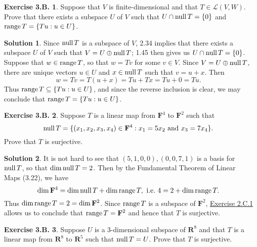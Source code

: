 \documentclass[12pt]{article}
\theoremstyle{definition}
\theoremstyle{exercise}
\newtheorem{exercise}{Exercise 3.B.}
\theoremstyle{solution}
\newtheorem*{solution}{Solution}
\newcommand{\lmap}{\mathcal{L}}
\newcommand{\Null}{\text{null\,}}
\newcommand{\Range}{\text{range\,}}
\newcommand{\R}{\mathbf{R}}
\newcommand{\F}{\mathbf{F}}
\begin{document}
\begin{exercise}
\label{ex:12}
    Suppose that \( V \) is finite-dimensional and that \( T \in \lmap(V, W) \). Prove that there exists a subspace \( U \) of \( V \) such that \( U \cap \Null T = \{ 0 \} \) and \( \Range T = \{ Tu : u \in U \} \).
\end{exercise}

\begin{solution}
    Since \( \Null T \) is a subspace of \( V \), 2.34 implies that there exists a subspace \( U \) of \( V \) such that \( V = U \oplus \Null T \); 1.45 then gives us \( U \cap \Null T = \{ 0 \} \). Suppose that \( w \in \Range T \), so that \( w = Tv \) for some \( v \in V \). Since \( V = U \oplus \Null T \), there are unique vectors \( u \in U \) and \( x \in \Null T \) such that \( v = u + x \). Then
    \[
        w = Tv = T(u + x) = Tu + Tx = Tu + 0 = Tu.
    \]
    Thus \( \Range T \subseteq \{ Tu : u \in U \} \), and since the reverse inclusion is clear, we may conclude that \( \Range T = \{ Tu : u \in U \} \).
\end{solution}

\begin{exercise}
\label{ex:13}
    Suppose \( T \) is a linear map from \( \F^4 \) to \( \F^2 \) such that
    \[
        \Null T = \{ (x_1, x_2, x_3, x_4) \in \F^4 : x_1 = 5 x_2 \text{ and } x_3 = 7 x_4 \}.
    \]
    Prove that \( T \) is surjective.
\end{exercise}

\begin{solution}
    It is not hard to see that \( (5, 1, 0, 0), (0, 0, 7, 1) \) is a basis for \( \Null T \), so that \( \dim \Null T = 2 \). Then by the Fundamental Theorem of Linear Maps (3.22), we have
    \[
        \dim \F^4 = \dim \Null T + \dim \Range T, \text{ i.e.\ } 4 = 2 + \dim \Range T.
    \]
    Thus \( \dim \Range T = 2 = \dim \F^2 \). Since \( \Range T \) is a subspace of \( \F^2 \), \href{https://lew98.github.io/Mathematics/LADR_Section_2_C_Exercises.pdf}{Exercise 2.C.1} allows us to conclude that \( \Range T = \F^2 \) and hence that \( T \) is surjective.
\end{solution}

\begin{exercise}
\label{ex:14}
    Suppose \( U \) is a 3-dimensional subspace of \( \R^8 \) and that \( T \) is a linear map from \( \R^8 \) to \( \R^5 \) such that \( \Null T = U \). Prove that \( T \) is surjective.
\end{exercise}
\end{document}
